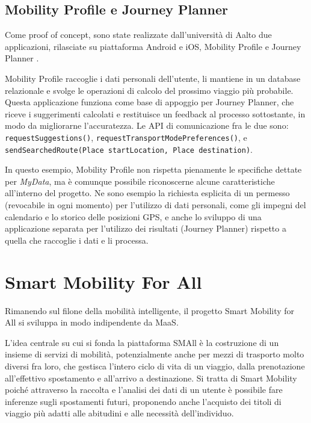 \subsection{Mobility Profile e Journey Planner}
\label{sec:Contesto-MobProfJPlann}
Come proof of concept, sono state realizzate dall’università di Aalto due applicazioni, rilasciate su piattaforma Android e iOS, Mobility Profile \cite{githubmobilityprofile} e Journey Planner \cite{githubjourneyplanner}.

Mobility Profile raccoglie i dati personali dell’utente, li mantiene in un database relazionale e svolge le operazioni di calcolo del prossimo viaggio pi\`u probabile. Questa applicazione funziona come base di appoggio per Journey Planner, che riceve i suggerimenti calcolati e restituisce un feedback al processo sottostante, in modo da migliorarne l’accuratezza. Le API di comunicazione fra le due sono:
\texttt{requestSuggestions()}, \texttt{requestTransportModePreferences()}, e \texttt{sendSearchedRoute(Place startLocation, Place destination)}.

In questo esempio, Mobility Profile non rispetta pienamente le specifiche dettate per \textit{MyData}, ma \`e comunque possibile riconoscerne alcune caratteristiche all’interno del progetto. Ne sono esempio la richiesta esplicita di un permesso (revocabile in ogni momento) per l’utilizzo di dati personali, come gli impegni del calendario e lo storico delle posizioni GPS, e anche lo sviluppo di una applicazione separata per l’utilizzo dei risultati (Journey Planner) rispetto a quella che raccoglie i dati e li processa.

\section{Smart Mobility For All}
Rimanendo sul filone della mobilità intelligente, il progetto Smart Mobility for All \cite{githubsmall} si sviluppa in modo indipendente da MaaS. 

L’idea centrale su cui si fonda la piattaforma SMAll \`e la costruzione di un insieme di servizi di mobilità, potenzialmente anche per mezzi di trasporto molto diversi fra loro, che gestisca l’intero ciclo di vita di un viaggio, dalla prenotazione all’effettivo spostamento e all’arrivo a destinazione. Si tratta di Smart Mobility poich\'e attraverso la raccolta e l’analisi dei dati di un utente \`e possibile fare inferenze sugli spostamenti futuri, proponendo anche l’acquisto dei titoli di viaggio pi\`u adatti alle abitudini e alle necessità dell’individuo.

